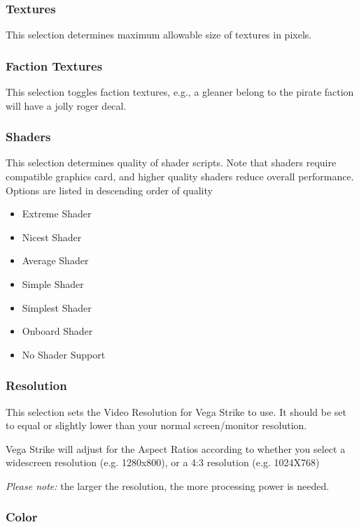 \documentclass{article}
\begin{document}
 
\subsubsection{Textures}

This selection determines maximum allowable size of textures in pixels. 

\subsubsection{Faction Textures}

This selection toggles faction textures, e.g., a gleaner belong to the pirate faction will have a jolly roger decal.

\subsubsection{Shaders}

This selection determines quality of shader scripts. Note that shaders require compatible graphics card, and higher quality shaders reduce overall performance. Options are listed in descending order of quality
\begin{itemize}
\item Extreme Shader
\item Nicest Shader
\item Average Shader
\item Simple Shader
\item Simplest Shader
\item Onboard Shader
\item No Shader Support
\end{itemize}


\subsubsection{Resolution }

This selection sets the Video Resolution for Vega Strike to use. It should be set to equal or slightly lower than your normal screen/monitor resolution.

Vega Strike will adjust for the Aspect Ratios according to whether you select a widescreen resolution (e.g. 1280x800), or a 4:3 resolution (e.g. 1024X768)



 \textit{Please note:} the larger the resolution, the more processing power is needed. 



\subsubsection{Color }
\end{document}
